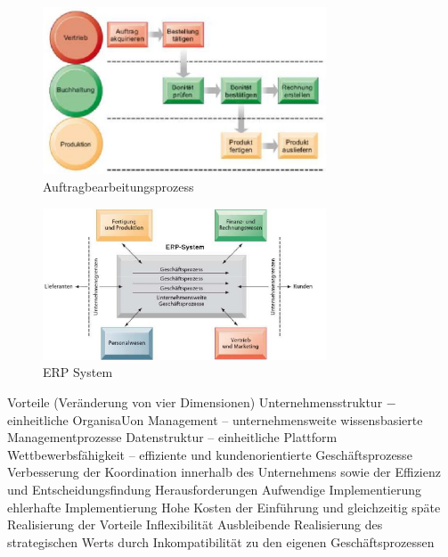 \documentclass[ngerman,a4paper,12pt]{scrreprt}
\begin{document}
\begin{figure}[H]
	\centering
	\includegraphics[width=0.75\textwidth]{img/V9.4.jpg}
	\caption{Auftragbearbeitungsprozess}
	\label{}
\end{figure}






\begin{figure}[H]
	\centering
	\includegraphics[width=0.75\textwidth]{img/V9.5.jpg}
	\caption{ERP System}
	\label{}
\end{figure}

\ul
	\li Vorteile (Veränderung von vier Dimensionen)
		\ul
			\li Unternehmensstruktur − einheitliche OrganisaUon
			\li Management – unternehmensweite wissensbasierte
Managementprozesse
			\li Datenstruktur – einheitliche Plattform
			\li Wettbewerbsfähigkeit – effiziente und kundenorientierte Geschäftsprozesse
		\ulE
	\li \ra Verbesserung der Koordination innerhalb des
Unternehmens sowie der Effizienz und
Entscheidungsfindung
	\li Herausforderungen
		\ul
			\li Aufwendige Implementierung
			\li ehlerhafte Implementierung
			\li Hohe Kosten der Einführung und gleichzeitig späte
Realisierung der Vorteile
			\li Inflexibilität
			\li Ausbleibende Realisierung des strategischen Werts
durch Inkompatibilität zu den eigenen
Geschäftsprozessen
		\ulE
\ulE
\end{document}
